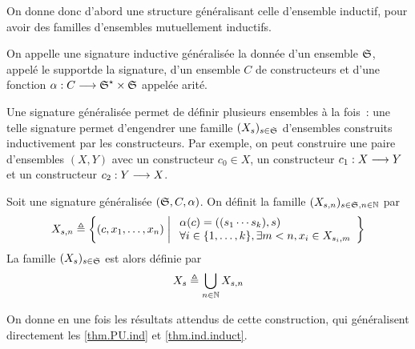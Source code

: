 On donne donc d'abord une structure généralisant celle d'ensemble inductif,
pour avoir des familles d'ensembles mutuellement inductifs.

\begin{definition}
  On appelle une signature inductive généralisée la donnée d'un ensemble
  $\mathfrak{S}$, appelé le \og support\fg de la signature, d'un ensemble $C$ de
  constructeurs et d'une fonction
  $\alpha : \displaystyle C \longrightarrow \mathfrak{S}^{\star}\times\mathfrak{S}$
  appelée arité.
\end{definition}

Une signature généralisée permet de définir plusieurs ensembles à la fois~:
une telle signature permet d'engendrer une famille $(X_s)_{s\in\mathfrak{S}}$
d'ensembles construits inductivement par les constructeurs. Par exemple, on
peut construire une paire d'ensembles $(X,Y)$ avec un constructeur
$c_0 \in X$, un constructeur $c_1 : \displaystyle X \longrightarrow Y$ et un constructeur
$c_2 : \displaystyle Y \longrightarrow X$.

\begin{definition}
  Soit une signature généralisée $(\mathfrak{S},C,\alpha)$. On définit la famille
  $(X_{s,n})_{s \in \mathfrak{S},n \in \mathbb N}$ par
  \[
  X_{s,n} \triangleq
  \left\{ (c,x_1,\ldots,x_n) \;\middle\vert\; \begin{array}{l}
      \alpha(c) = ((s_1\cdots s_k),s)\\
      \forall i \in \{1,\ldots,k\}, \exists m < n, x_i \in X_{s_i,m}
      \end{array} \right\}
  \]
  La famille $(X_s)_{s\in\mathfrak{S}}$ est alors définie par
  \[X_s \triangleq \bigcup_{n \in \mathbb N} X_{s,n}\]
\end{definition}

On donne en une fois les résultats attendus de cette construction, qui
généralisent directement les \cref{thm.PU.ind} et \cref{thm.ind.induct}.

